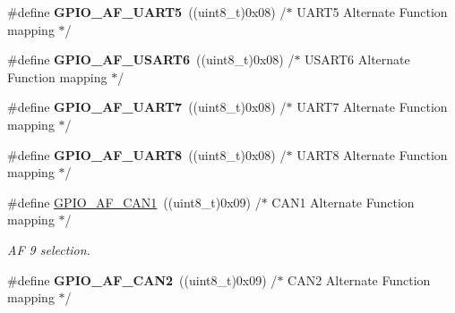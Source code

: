 \begin{DoxyCompactItemize}
\#define {\bfseries G\+P\+I\+O\+\_\+\+A\+F\+\_\+\+U\+A\+R\+T5}~((uint8\+\_\+t)0x08)  /$\ast$ U\+A\+R\+T5 Alternate Function mapping  $\ast$/
\item 
\mbox{\label{group___g_p_i_o___alternat__function__selection__define_gaf69942861848b5175369145ffc001c41}} 
\#define {\bfseries G\+P\+I\+O\+\_\+\+A\+F\+\_\+\+U\+S\+A\+R\+T6}~((uint8\+\_\+t)0x08)  /$\ast$ U\+S\+A\+R\+T6 Alternate Function mapping $\ast$/
\item 
\mbox{\label{group___g_p_i_o___alternat__function__selection__define_ga1ab3639821a77cc199e782b68383c1a0}} 
\#define {\bfseries G\+P\+I\+O\+\_\+\+A\+F\+\_\+\+U\+A\+R\+T7}~((uint8\+\_\+t)0x08)  /$\ast$ U\+A\+R\+T7 Alternate Function mapping  $\ast$/
\item 
\mbox{\label{group___g_p_i_o___alternat__function__selection__define_gac84e0813ab314b2cd22bc8758dd76e1b}} 
\#define {\bfseries G\+P\+I\+O\+\_\+\+A\+F\+\_\+\+U\+A\+R\+T8}~((uint8\+\_\+t)0x08)  /$\ast$ U\+A\+R\+T8 Alternate Function mapping  $\ast$/
\item 
\mbox{\label{group___g_p_i_o___alternat__function__selection__define_gaf5defeedc302bf348e31dd7bdcdd882f}} 
\#define \mbox{\hyperlink{group___g_p_i_o___alternat__function__selection__define_gaf5defeedc302bf348e31dd7bdcdd882f}{G\+P\+I\+O\+\_\+\+A\+F\+\_\+\+C\+A\+N1}}~((uint8\+\_\+t)0x09)  /$\ast$ C\+A\+N1 Alternate Function mapping  $\ast$/
\begin{DoxyCompactList}\small\item\em AF 9 selection. \end{DoxyCompactList}\item 
\mbox{\label{group___g_p_i_o___alternat__function__selection__define_ga4896d720d93f50f17207b4059ab5ebfb}} 
\#define {\bfseries G\+P\+I\+O\+\_\+\+A\+F\+\_\+\+C\+A\+N2}~((uint8\+\_\+t)0x09)  /$\ast$ C\+A\+N2 Alternate Function mapping  $\ast$/
\item 
\mbox{\label{group___g_p_i_o___alternat__function__selection__define_ga681ff7964f5d73ed973a299383b13c90}} 

\end{DoxyCompactItemize}
